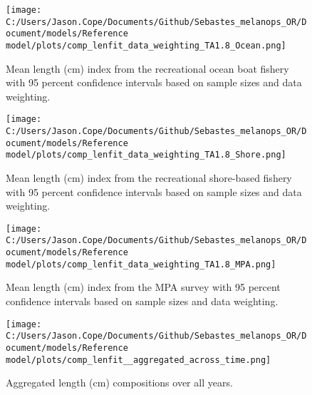 \documentclass[11pt,
  letterpaper,
]{article}
\begin{document}
\newpage

\begin{figure}
{\centering
\texttt{[image: C:/Users/Jason.Cope/Documents/Github/Sebastes\_melanops\_OR/Document/models/Reference model/plots/comp\_lenfit\_data\_weighting\_TA1.8\_Ocean.png]}
}
\caption{Mean length (cm) index from the recreational ocean boat fishery with 95 percent confidence intervals based on sample sizes and data weighting.\label{fig:ocean-mean-len-fit}}
\end{figure}

\newpage

\begin{figure}
{\centering
\texttt{[image: C:/Users/Jason.Cope/Documents/Github/Sebastes\_melanops\_OR/Document/models/Reference model/plots/comp\_lenfit\_data\_weighting\_TA1.8\_Shore.png]}
}
\caption{Mean length (cm) index from the recreational shore-based fishery with 95 percent confidence intervals based on sample sizes and data weighting.\label{fig:shore-mean-len-fit}}
\end{figure}

\newpage

\begin{figure}
{\centering
\texttt{[image: C:/Users/Jason.Cope/Documents/Github/Sebastes\_melanops\_OR/Document/models/Reference model/plots/comp\_lenfit\_data\_weighting\_TA1.8\_MPA.png]}
}
\caption{Mean length (cm) index from the MPA survey with 95 percent confidence intervals based on sample sizes and data weighting.\label{fig:mpa-mean-len-fit}}
\end{figure}

\newpage

\begin{figure}
{\centering
\texttt{[image: C:/Users/Jason.Cope/Documents/Github/Sebastes\_melanops\_OR/Document/models/Reference model/plots/comp\_lenfit\_\_aggregated\_across\_time.png]}
}
\caption{Aggregated length (cm) compositions over all years.\label{fig:agg-len-fit}}
\end{figure}

\newpage
\end{document}
